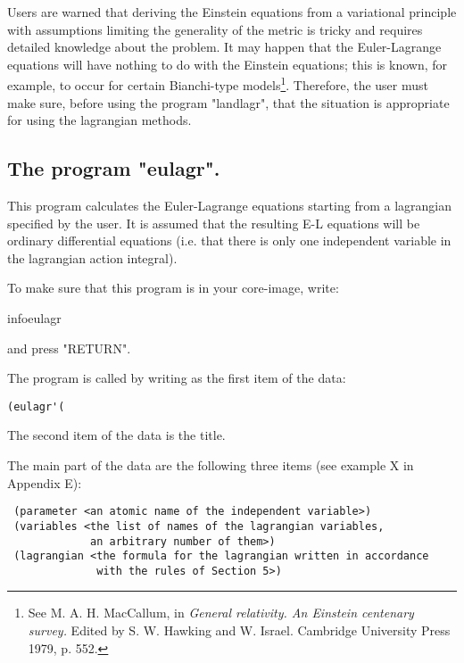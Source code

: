 Users are warned that deriving the Einstein equations from a variational
principle with assumptions limiting the generality of the metric is tricky and
requires detailed knowledge about the problem. It may happen that the
Euler-Lagrange equations will have nothing to do with the Einstein equations;
this is known, for example, to occur for certain Bianchi-type
models\footnote{See M. A. H. MacCallum, in {\it General relativity. An Einstein
centenary survey.} Edited by S. W. Hawking and W. Israel. Cambridge University
Press 1979, p. 552.}. Therefore, the user must make sure, before using the
program "landlagr", that the situation is appropriate for using the lagrangian
methods.

\subsection{The program "eulagr".}

This program calculates the Euler-Lagrange equations starting from a lagrangian
specified by the user. It is assumed that the resulting E-L equations will be
ordinary differential equations (i.e. that there is only one independent
variable in the lagrangian action integral).

To make sure that this program is in your core-image, write:

\bigskip

infoeulagr

\bigskip

\noindent and press "RETURN".

The program is called by writing as the first item of the data:

\bigskip

\begin{verbatim}
(eulagr'(
\end{verbatim}

\bigskip

The second item of the data is the title.

The main part of the data are the following three items (see example X in
Appendix E):

\bigskip

\begin{verbatim}
 (parameter <an atomic name of the independent variable>)
 (variables <the list of names of the lagrangian variables,
             an arbitrary number of them>)
 (lagrangian <the formula for the lagrangian written in accordance
              with the rules of Section 5>)
\end{verbatim}

